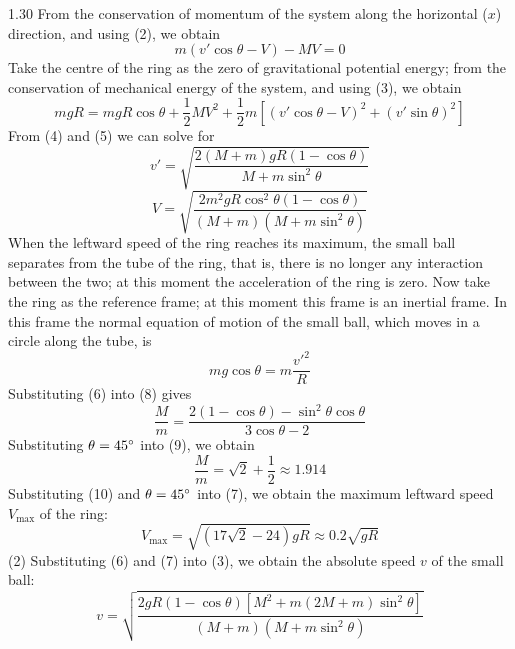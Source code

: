 \begin{solution}{1.30}
From the conservation of momentum of the system along the horizontal ($x$) direction, and using (2), we obtain
\begin{equation}
m(v'\cos\theta-V)-MV=0 \tag{4}
\end{equation}
Take the centre of the ring as the zero of gravitational potential energy; from the conservation of mechanical energy of the system, and using (3), we obtain
\begin{equation}
mgR=mgR\cos\theta+\frac{1}{2}MV^2+\frac{1}{2}m\left[(v'\cos\theta-V)^2+(v'\sin\theta)^2\right] \tag{5}
\end{equation}
From (4) and (5) we can solve for
\begin{equation}
v'=\sqrt{\frac{2(M+m)gR(1-\cos\theta)}{M+m\sin^2\theta}} \tag{6}
\end{equation}
\begin{equation}
V=\sqrt{\frac{2m^2gR\cos^2\theta(1-\cos\theta)}{(M+m)(M+m\sin^2\theta)}} \tag{7}
\end{equation}
When the leftward speed of the ring reaches its maximum, the small ball separates from the tube of the ring, that is, there is no longer any interaction between the two; at this moment the acceleration of the ring is zero. Now take the ring as the reference frame; at this moment this frame is an inertial frame. In this frame the normal equation of motion of the small ball, which moves in a circle along the tube, is
\begin{equation}
mg\cos\theta=m\frac{v'^2}{R} \tag{8}
\end{equation}
Substituting (6) into (8) gives
\begin{equation}
\frac{M}{m}=\frac{2(1-\cos\theta)-\sin^2\theta\cos\theta}{3\cos\theta-2} \tag{9}
\end{equation}
Substituting $\theta=45^{\circ}$ into (9), we obtain
\begin{equation}
\frac{M}{m}=\sqrt{2}+\frac{1}{2}\approx 1.914 \tag{10}
\end{equation}
Substituting (10) and $\theta=45^{\circ}$ into (7), we obtain the maximum leftward speed $V_{\max}$ of the ring:
\begin{equation*}
V_{\max}=\sqrt{(17\sqrt{2}-24)gR}\approx 0.2\sqrt{gR}
\end{equation*}
(2) Substituting (6) and (7) into (3), we obtain the absolute speed $v$ of the small ball:
\begin{equation}
v=\sqrt{\frac{2gR(1-\cos\theta)\left[M^2+m(2M+m)\sin^2\theta\right]}{(M+m)(M+m\sin^2\theta)}} \tag{11}
\end{equation}

\end{solution}
